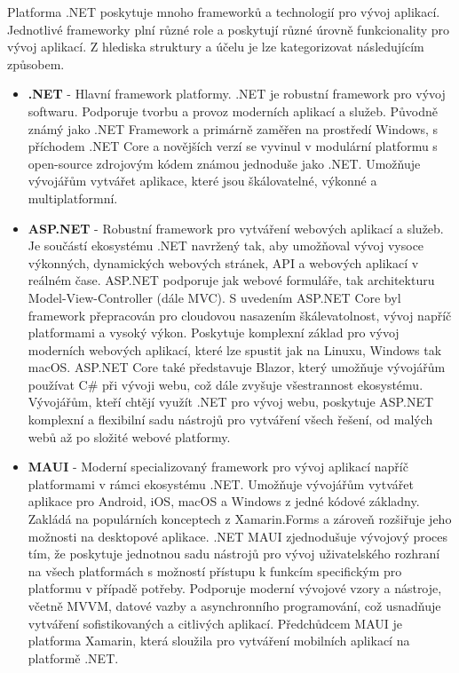 
Platforma .NET poskytuje mnoho frameworků a technologií pro vývoj aplikací. Jednotlivé frameworky plní různé role a poskytují různé úrovně funkcionality pro vývoj aplikací. Z hlediska struktury a účelu je lze kategorizovat následujícím způsobem. \cite{netdocs}

\begin{itemize}
    \item \textbf{.NET} - Hlavní framework platformy. .NET je robustní framework pro vývoj softwaru. Podporuje tvorbu a provoz moderních aplikací a služeb. Původně známý jako .NET Framework a primárně zaměřen na prostředí Windows, s příchodem .NET Core a novějších verzí se vyvinul v modulární platformu s open-source zdrojovým kódem známou jednoduše jako .NET. Umožňuje vývojářům vytvářet aplikace, které jsou škálovatelné, výkonné a multiplatformní.
    \item \textbf{ASP.NET} - Robustní framework pro vytváření webových aplikací a služeb. Je součástí ekosystému .NET navržený tak, aby umožňoval vývoj vysoce výkonných, dynamických webových stránek, API a webových aplikací v reálném čase. ASP.NET podporuje jak webové formuláře, tak architekturu Model-View-Controller (dále MVC). S uvedením ASP.NET Core byl framework přepracován pro cloudovou nasazením škálevatolnost, vývoj napříč platformami a vysoký výkon. Poskytuje komplexní základ pro vývoj moderních webových aplikací, které lze spustit jak na Linuxu, Windows tak macOS. ASP.NET Core také představuje Blazor, který umožňuje vývojářům používat C\# při vývoji webu, což dále zvyšuje všestrannost ekosystému. Vývojářům, kteří chtějí využít .NET pro vývoj webu, poskytuje ASP.NET komplexní a flexibilní sadu nástrojů pro vytváření všech řešení, od malých webů až po složité webové platformy.
    \item \textbf{MAUI} - Moderní specializovaný framework pro vývoj aplikací napříč platformami v rámci ekosystému .NET. Umožňuje vývojářům vytvářet aplikace pro Android, iOS, macOS a Windows z jedné kódové základny. Zakládá na populárních konceptech z Xamarin.Forms a zároveň rozšiřuje jeho možnosti na desktopové aplikace. .NET MAUI zjednodušuje vývojový proces tím, že poskytuje jednotnou sadu nástrojů pro vývoj uživatelského rozhraní na všech platformách s možností přístupu k funkcím specifickým pro platformu v případě potřeby. Podporuje moderní vývojové vzory a nástroje, včetně MVVM, datové vazby a asynchronního programování, což usnadňuje vytváření sofistikovaných a citlivých aplikací. Předchůdcem MAUI je platforma Xamarin, která sloužila pro vytváření mobilních aplikací na platformě .NET. \cite{Libery2023}

\end{itemize}
